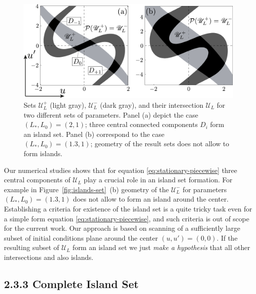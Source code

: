 \begin{figure}[h]
\centering
	\includegraphics[scale = 1]{pic/island set for piecewise equation}
	\caption{
		Sets $\mathscr{U}_L^+$ (light gray), $\mathscr{U}_L^-$ (dark gray), and their intersection $\mathscr{U}_L$ for two different sets of parameters.
		Panel (a) depict the case $(L_*, L_0) = (2, 1)$; three central connected components $D_i$ form an island set.
		Panel (b) correspond to the case $(L_*, L_0) = (1.3, 1)$; geometry of the result sets does not allow to form islands.
	}
\label{fig:island-set-piecewise}
\end{figure}

Our numerical studies shows that for equation \eqref{eq:stationary-piecewise} three central components of $\mathscr{U}_L$ play a crucial role in an island set formation.
For example in Figure~\ref{fig:islands-set}~(b) geometry of the $\mathscr{U}_L^-$ for parameters $(L_*, L_0) = (1.3, 1)$ does not allow to form an island around the center.
Establishing a criteria for existence of the island set is a quite tricky task even for a simple form equation \eqref{eq:stationary-piecewise}, and such criteria is out of scope for the current work.
Our approach is based on scanning of a sufficiently large subset of initial conditions plane around the center $(u, u') = (0, 0)$.
If the resulting subset of $\mathscr{U}_L$ form an island set we just {\it make a hypothesis} that all other intersections and also islands.

\subsection*{2.3.3 Complete Island Set}

